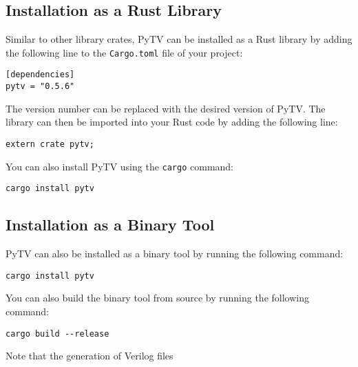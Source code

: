 \subsection{Installation as a Rust Library}
Similar to other library crates, PyTV can be installed as a Rust library by adding the following line to the \texttt{Cargo.toml} file of your project:
\begin{verbatim}
[dependencies]
pytv = "0.5.6"
\end{verbatim}
The version number can be replaced with the desired version of PyTV.
The library can then be imported into your Rust code by adding the following line:
\begin{verbatim}
extern crate pytv;
\end{verbatim}

You can also install PyTV using the \texttt{cargo} command:
\begin{verbatim}
cargo install pytv
\end{verbatim}

\subsection{Installation as a Binary Tool}
PyTV can also be installed as a binary tool by running the following command:
\begin{verbatim}
cargo install pytv
\end{verbatim}

You can also build the binary tool from source by running the following command:
\begin{verbatim}
cargo build --release
\end{verbatim}

Note that the generation of Verilog files 
